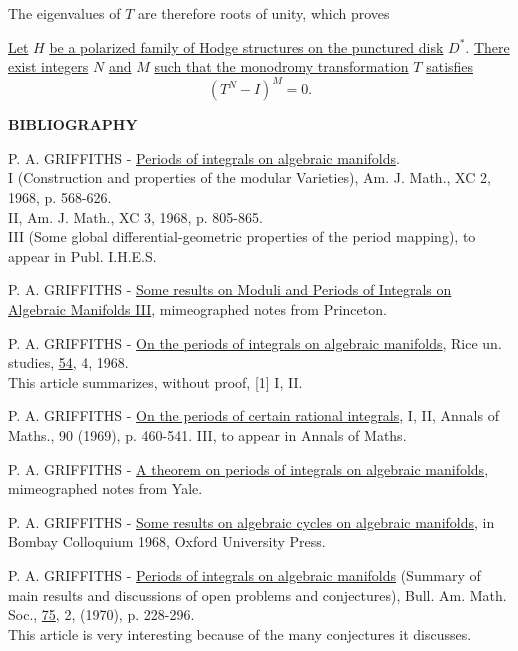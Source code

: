 \documentclass[10pt,leqno]{article}
\theoremstyle{deligne}
\renewcommand{\underline}[1]{\uline{#1}}
\begin{document}
The eigenvalues of $T$ are therefore roots of unity, which proves

\begin{monodromyTheorem}[6.5 (A. Borel)]
\underline{Let} $H$ \underline{be a polarized family of Hodge structures on the punctured disk} $D^*$. \underline{There exist integers} $N$ \underline{and} $M$ \underline{such that the monodromy transformation} $T$ \underline{satisfies}
\[
  (T^N-I)^M=0.
\]
\end{monodromyTheorem}

\begin{center}
\bfseries BIBLIOGRAPHY
\end{center}

\begin{enumerate}[label={[\arabic*]},leftmargin=2.8em]
\item P. A. GRIFFITHS - \uline{Periods of integrals on algebraic manifolds}.\\
I (Construction and properties of the modular Varieties), Am. J. Math., XC 2, 1968, p. 568-626.\\
II, Am. J. Math., XC 3, 1968, p. 805-865.\\
III (Some global differential-geometric properties of the period mapping), to appear in Publ. I.H.E.S.

\item P. A. GRIFFITHS - \uline{Some results on Moduli and Periods of Integrals on Algebraic Manifolds III}, mimeographed notes from Princeton.

\item P. A. GRIFFITHS - \uline{On the periods of integrals on algebraic manifolds}, Rice un. studies, \uline{54}, 4, 1968.\\
This article summarizes, without proof, [1] I, II.

\item P. A. GRIFFITHS - \uline{On the periods of certain rational integrals}, I, II, Annals of Maths., 90 (1969), p. 460-541. III, to appear in Annals of Maths.

\item P. A. GRIFFITHS - \uline{A theorem on periods of integrals on algebraic manifolds}, mimeographed notes from Yale.

\item P. A. GRIFFITHS - \uline{Some results on algebraic cycles on algebraic manifolds}, in Bombay Colloquium 1968, Oxford University Press.

\item P. A. GRIFFITHS - \uline{Periods of integrals on algebraic manifolds} (Summary of main results and discussions of open problems and conjectures), Bull. Am. Math. Soc., \uline{75}, 2, (1970), p. 228-296.\\
This article is very interesting because of the many conjectures it discusses.


\end{enumerate}
\end{document}
